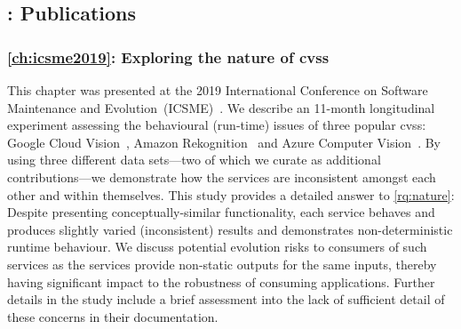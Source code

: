 \subsection{: Publications}

\subsubsection{\cref{ch:icsme2019}: Exploring the nature of \glspl{cvs}} This chapter was presented at the 2019 International Conference on Software Maintenance and Evolution~(ICSME)~\citep{Cummaudo:2019icsme}. We describe an 11-month longitudinal experiment assessing the behavioural (run-time) issues of three popular \glspl{cvs}: Google Cloud Vision~, Amazon Rekognition~ and Azure Computer Vision~. By using three different data sets---two of which we curate as additional contributions---we demonstrate how the services are inconsistent amongst each other and within themselves. This study provides a detailed answer to \ref{rq:nature}: Despite presenting conceptually-similar functionality, each service behaves and produces slightly varied (inconsistent) results and demonstrates non-deterministic runtime behaviour. We discuss potential evolution risks to consumers of such services as the services provide non-static outputs for the same inputs, thereby having significant impact to the robustness of consuming applications. Further details in the study include a brief assessment into the lack of sufficient detail of these concerns in their documentation.

